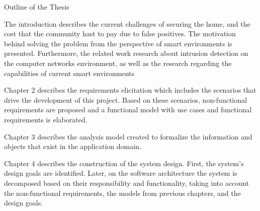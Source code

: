 \clearemptydoublepage

{}

\begin{center}
	\huge{Outline of the Thesis}
\end{center}


  \vspace{1mm}

\noindent  The introduction describes the current challenges of securing the home, and the cost that the community hast to pay due to false positives. The motivation behind solving the problem from the perspective of smart environments is presented. Furthermore, the related work research about intrusion detection on the computer networks environment, as well as the research regarding the capabilities of current smart environments\\

  \vspace{1mm}

\noindent  Chapter 2 describes the requirements elicitation which includes the scenarios that drive the development of this project. Based on these scenarios, non-functional requirements are proposed and a functional model with use cases and functional requirements is elaborated. \\

  \vspace{1mm}

\noindent  Chapter 3 describes the analysis model created to formalize the information and objects that exist in the application domain.\\

  \vspace{1mm}

\noindent  Chapter 4 describes the construction of the system design. First, the system's design goals are identified. Later, on the software architecture the system is decomposed based on their responsibility and functionality, taking into account the non-functional requirements, the models from previous chapters, and the design goals. \\

  \vspace{1mm}

